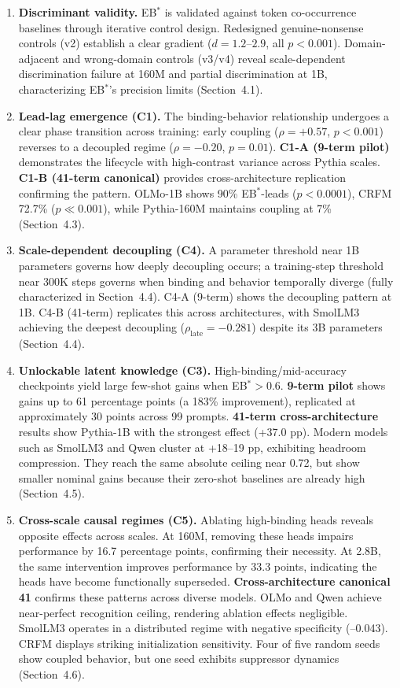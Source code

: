 \documentclass[10pt]{article} %
\begin{document}
\begin{enumerate}
  \item \textbf{Discriminant validity.} EB$^*$ is validated against token co-occurrence baselines through iterative control design. Redesigned genuine-nonsense controls (v2) establish a clear gradient ($d=1.2$--$2.9$, all $p<0.001$). Domain-adjacent and wrong-domain controls (v3/v4) reveal scale-dependent discrimination failure at 160M and partial discrimination at 1B, characterizing EB$^*$'s precision limits (Section~4.1).
  \item \textbf{Lead-lag emergence (C1).} The binding-behavior relationship undergoes a clear phase transition across training: early coupling ($\rho=+0.57$, $p<0.001$) reverses to a decoupled regime ($\rho=-0.20$, $p=0.01$).
  \textbf{C1-A (9-term pilot)} demonstrates the lifecycle with high-contrast variance across Pythia scales.
  \textbf{C1-B (41-term canonical)} provides cross-architecture replication confirming the pattern. OLMo-1B shows 90\% EB$^*$-leads ($p<0.0001$), CRFM 72.7\% ($p \ll 0.001$), while Pythia-160M maintains coupling at 7\% (Section~4.3).
  \item \textbf{Scale-dependent decoupling (C4).} A parameter threshold near 1B parameters governs how deeply decoupling occurs; a training-step threshold near 300K steps governs when binding and behavior temporally diverge (fully characterized in Section~4.4).
  C4-A (9-term) shows the decoupling pattern at 1B. C4-B (41-term) replicates this across architectures, with SmolLM3 achieving the deepest decoupling ($\rho_\text{late}=-0.281$) despite its 3B parameters (Section~4.4).
  \item \textbf{Unlockable latent knowledge (C3).} High-binding/mid-accuracy checkpoints yield large few-shot gains when EB$^*>0.6$.
  \textbf{9-term pilot} shows gains up to 61 percentage points (a 183\% improvement), replicated at approximately 30 points across 99 prompts.
  \textbf{41-term cross-architecture} results show Pythia-1B with the strongest effect (+37.0 pp). Modern models such as SmolLM3 and Qwen cluster at +18--19 pp, exhibiting headroom compression. They reach the same absolute ceiling near 0.72, but show smaller nominal gains because their zero-shot baselines are already high (Section~4.5).
  \item \textbf{Cross-scale causal regimes (C5).} Ablating high-binding heads reveals opposite effects across scales. At 160M, removing these heads impairs performance by 16.7 percentage points, confirming their necessity. At 2.8B, the same intervention improves performance by 33.3 points, indicating the heads have become functionally superseded.
  \textbf{Cross-architecture canonical 41} confirms these patterns across diverse models. OLMo and Qwen achieve near-perfect recognition ceiling, rendering ablation effects negligible. SmolLM3 operates in a distributed regime with negative specificity (--0.043). CRFM displays striking initialization sensitivity. Four of five random seeds show coupled behavior, but one seed exhibits suppressor dynamics (Section~4.6).
\end{enumerate}
\end{document}
